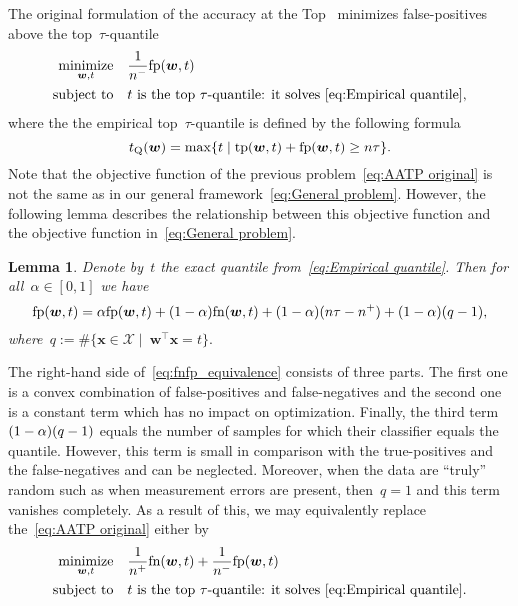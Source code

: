 \documentclass[11pt,a4paper]{article}
\newtheorem{lemma}[thm]{Lemma}
\theoremstyle{definition}
\let\originalleft\left
\let\originalright\right
\renewcommand{\left}{\mathopen{}\mathclose\bgroup\originalleft}
\renewcommand{\right}{\aftergroup\egroup\originalright}
\newcommand{\minimize}{\operatorname*{minimize}}
\newcommand{\st}{\operatorname{subject\ to}}
\newcommand{\X}{\mathcal{X}}
\newcommand{\tp}{\textnormal{tp}}
\newcommand{\fp}{\textnormal{fp}}
\newcommand{\fn}{\textnormal{fn}}
\begin{document}
The original formulation of the accuracy at the Top~\cite{boyd2012accuracy} minimizes false-positives above the top~$\tau$-quantile
\begin{equation}\label{eq:AATP original}
  \begin{aligned}
    \minimize_{\bm{w}, t} & \quad \frac{1}{n^-}\fp(\bm{w},t) \\
    \st                   & \quad t \text{ is the top \ensuremath{\tau}-quantile: it solves }\eqref{eq:Empirical quantile},
  \end{aligned}
\end{equation}
where the the empirical top~$\tau$-quantile is defined by the following formula
\begin{equation}\label{eq:Empirical quantile} 
  t_{\rm Q}(\bm{w}) = \max\left\{t\mid \tp(\bm{w},t) + \fp(\bm{w},t)\ge n\tau\right\}.
\end{equation}
Note that the objective function of the previous problem~\eqref{eq:AATP original} is not the same as in our general framework~\eqref{eq:General problem}. However, the following lemma describes the relationship between this objective function and the objective function in~\eqref{eq:General problem}.
\begin{lemma}
  Denote by~$t$ the exact quantile from~\eqref{eq:Empirical quantile}. Then for all~$\alpha\in[0,1]$ we have
  \begin{equation}\label{eq:fnfp_equivalence}
    \fp (\bm{w},t) = \alpha \fp(\bm{w},t) + (1-\alpha)\fn(\bm{w},t) + (1-\alpha)(n\tau - n^+) + (1-\alpha)(q - 1),
  \end{equation}
  where~$q:= \#\{\bm{x} \in \X \mid \ \bm{w}^\top \bm{x} = t\}.$
\end{lemma}
\noindent The right-hand side of~\eqref{eq:fnfp_equivalence} consists of three parts. The first one is a convex combination of false-positives and false-negatives and the second one is a constant term which has no impact on optimization. Finally, the third term~$(1-\alpha)\left(q - 1\right)$ equals the number of samples for which their classifier equals the quantile. However, this term is small in comparison with the true-positives and the false-negatives and can be neglected. Moreover, when the data are ``truly'' random such as when measurement errors are present, then~$q = 1$ and this term vanishes completely. As a result of this, we may equivalently replace the~\eqref{eq:AATP original} either by
\begin{equation}\label{eq:AATP robust}
  \begin{aligned}
    \minimize_{\bm{w}, t} & \quad \frac{1}{n^+}\fn(\bm{w},t) + \frac{1}{n^-}\fp(\bm{w},t)\\
    \st                   & \quad t \text{ is the top \ensuremath{\tau}-quantile: it solves }\eqref{eq:Empirical quantile}.
  \end{aligned}
\end{equation}
\end{document}
